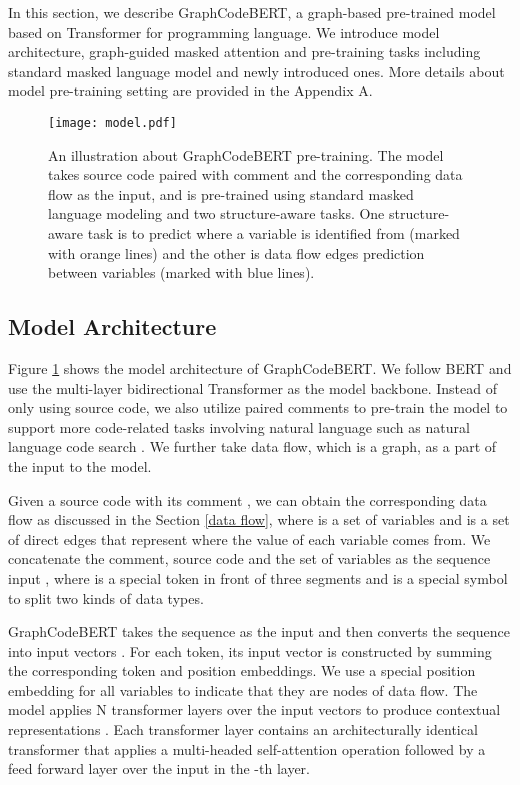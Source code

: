 \documentclass{article} \usepackage{iclr2021_conference,times}
\begin{document}
In this section, we describe GraphCodeBERT, a graph-based pre-trained model based on Transformer for programming language. 
We introduce model architecture, graph-guided masked attention and pre-training tasks including standard masked language model and newly introduced ones. More details about model pre-training setting are provided in the Appendix A.


\begin{figure}[t]
\begin{center}
		\texttt{[image: model.pdf]}
		\caption{An illustration about GraphCodeBERT pre-training. The model takes source code paired with comment and the corresponding data flow as the input, and is pre-trained using standard masked language modeling \citep{devlin2018bert} and two structure-aware tasks. One structure-aware task is to predict where a variable is identified from (marked with orange lines) and the other is data flow edges prediction between variables (marked with blue lines).   }
		\label{figure-model}
	\end{center}

\end{figure}

\subsection{Model Architecture}
Figure \ref{figure-model} shows the model architecture of GraphCodeBERT. We follow BERT \citep{devlin2018bert} and use the multi-layer bidirectional Transformer \citep{vaswani2017attention} as the model backbone.
Instead of only using source code, we also utilize paired comments to pre-train the model to support more code-related tasks involving natural language such as natural language code search \citep{feng2020codebert}.
We further take data flow, which is a graph, as a part of the input to the model.


Given a source code  with its comment , we can obtain the corresponding data flow  as discussed in the Section \ref{data flow}, where  is a set of variables and  is a set of direct edges that represent where the value of each variable comes from.
We concatenate the comment, source code and the set of variables as the sequence input  , where  is a special token in front of three segments and  is a special symbol to split two kinds of data types.

GraphCodeBERT takes the sequence  as the input and then converts the sequence into input vectors . For each token, its input vector is constructed by summing the corresponding token and position embeddings. We use a special position embedding for all variables to indicate that they are nodes of data flow. The model applies N transformer layers over the input vectors to produce contextual representations . Each transformer layer contains an architecturally identical transformer that applies a multi-headed self-attention operation \citep{vaswani2017attention} followed by a feed forward layer over the input  in the -th layer.
\end{document}
